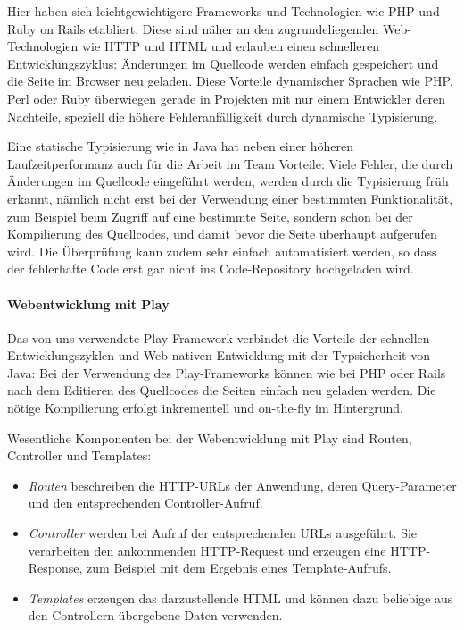 \documentclass[a4paper,
fontsize=11pt,
oneside,
numbers=noperiodatend,
parskip=half-,
bibliography=totoc,
final
]{scrartcl}
\providecommand{\tightlist}{%
  \setlength{\itemsep}{0pt}\setlength{\parskip}{0pt}}
\begin{document}
Hier haben sich leichtgewichtigere Frameworks und Technologien wie PHP
und Ruby on Rails etabliert. Diese sind näher an den zugrundeliegenden
Web-Technologien wie HTTP und HTML und erlauben einen schnelleren
Entwicklungszyklus: Änderungen im Quellcode werden einfach gespeichert
und die Seite im Browser neu geladen. Diese Vorteile dynamischer
Sprachen wie PHP, Perl oder Ruby überwiegen gerade in Projekten mit nur
einem Entwickler deren Nachteile, speziell die höhere Fehleranfälligkeit
durch dynamische Typisierung.

Eine statische Typisierung wie in Java hat neben einer höheren
Laufzeitperformanz auch für die Arbeit im Team Vorteile: Viele Fehler,
die durch Änderungen im Quellcode eingeführt werden, werden durch die
Typisierung früh erkannt, nämlich nicht erst bei der Verwendung einer
bestimmten Funktionalität, zum Beispiel beim Zugriff auf eine bestimmte
Seite, sondern schon bei der Kompilierung des Quellcodes, und damit
bevor die Seite überhaupt aufgerufen wird. Die Überprüfung kann zudem
sehr einfach automatisiert werden, so dass der fehlerhafte Code erst gar
nicht ins Code-Repository hochgeladen wird.

\paragraph{Webentwicklung mit Play}\label{webentwicklung-mit-play}

Das von uns verwendete Play-Framework verbindet die Vorteile der
schnellen Entwicklungszyklen und Web-nativen Entwicklung mit der
Typsicherheit von Java: Bei der Verwendung des Play-Frameworks können
wie bei PHP oder Rails nach dem Editieren des Quellcodes die Seiten
einfach neu geladen werden. Die nötige Kompilierung erfolgt inkrementell
und on-the-fly im Hintergrund.

Wesentliche Komponenten bei der Webentwicklung mit Play sind Routen,
Controller und Templates:

\begin{itemize}
\tightlist
\item
  \emph{Routen} beschreiben die HTTP-URLs der Anwendung, deren
  Query-Parameter und den entsprechenden Controller-Aufruf.
\item
  \emph{Controller} werden bei Aufruf der entsprechenden URLs
  ausgeführt. Sie verarbeiten den ankommenden HTTP-Request und erzeugen
  eine HTTP-Response, zum Beispiel mit dem Ergebnis eines
  Template-Aufrufs.
\item
  \emph{Templates} erzeugen das darzustellende HTML und können dazu
  beliebige aus den Controllern übergebene Daten verwenden.
\end{itemize}
\end{document}
